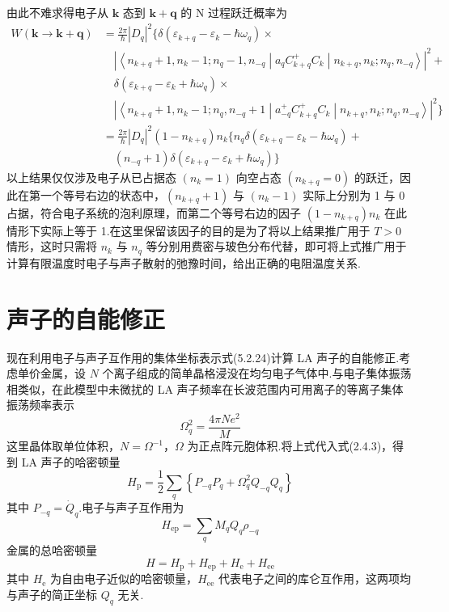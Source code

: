 由此不难求得电子从 $\boldsymbol{k}$ 态到 $\boldsymbol{k}+\boldsymbol{q}$ 的 N 过程跃迁概率为
\begin{equation}
\begin{aligned}
  W\left(\boldsymbol{k}\to\boldsymbol{k}+\boldsymbol{q}\right)&=\frac{2\pi}{\hbar}\left|D_q\right|^2
  \bigl\{\delta\left(\varepsilon_{k+q}-\varepsilon_k-\hbar\omega_q\right)\times\\
  &\quad\left|\left\langle n_{k+q}+1,n_k-1;n_q-1,n_{-q}\middle|a_qC_{k+q}^{+}C_k
  \middle|n_{k+q},n_k;n_q,n_{-q}\right\rangle\right|^2+\\
  &\quad\delta\left(\varepsilon_{k+q}-\varepsilon_k+\hbar\omega_q\right)\times\\
  &\quad\left|\left\langle n_{k+q}+1,n_k-1;n_q,n_{-q}+1\middle|a_{-q}^{+}C_{k+q}^{+}C_k
  \middle|n_{k+q},n_k;n_q,n_{-q}\right\rangle\right|^2\bigl\}\\
  &=\frac{2\pi}{\hbar}\left|D_q\right|^2\left(1-n_{k+q}\right)n_k
  \bigl\{n_q\delta\left(\varepsilon_{k+q}-\varepsilon_k-\hbar\omega_q\right)+\\
  &\quad\left(n_{-q}+1\right)\delta\left(\varepsilon_{k+q}-\varepsilon_k+\hbar\omega_q\right)\bigr\}
\end{aligned}
\end{equation}
以上结果仅仅涉及电子从已占据态 $\left(n_k=1\right)$ 向空占态 $\left(n_{k+q}=0\right)$ 的跃迁，因此在第一个等号右边的状态中，$\left(n_{k+q}+1\right)$ 与 $\left(n_k-1\right)$ 实际上分别为 1 与 0 占据，符合电子系统的泡利原理，而第二个等号右边的因子 $\left(1-n_{k+q}\right)n_k$ 在此情形下实际上等于 1.在这里保留该因子的目的是为了将以上结果推广用于 $T>0$ 情形，这时只需将 $n_k$ 与 $n_q$ 等分别用费密与玻色分布代替，即可将上式推广用于计算有限温度时电子与声子散射的弛豫时间，给出正确的电阻温度关系.

\section{声子的自能修正}

现在利用电子与声子互作用的集体坐标表示式(5.2.24)计算 LA 声子的自能修正.考虑单价金属，设 $N$ 个离子组成的简单晶格浸没在均匀电子气体中.与电子集体振荡相类似，在此模型中未微扰的 LA 声子频率在长波范围内可用离子的等离子集体振荡频率表示
\begin{equation}
  \Omega_q^2=\frac{4\pi Ne^2}{M}
\end{equation}
这里晶体取单位体积，$N=\Omega^{-1}$，$\Omega$ 为正点阵元胞体积.将上式代入式(2.4.3)，得到 LA 声子的哈密顿量
\begin{equation}
  H_{\mathrm{p}}=\frac{1}{2}\sum_{q}\left\{P_{-q}P_q+\Omega_q^2Q_{-q}Q_q\right\}
\end{equation}
其中 $P_{-q}=\dot{Q}_q$.电子与声子互作用为
\begin{equation*}
  H_{\mathrm{ep}}=\sum_{q}M_qQ_q\rho_{-q}
\end{equation*}
金属的总哈密顿量
\begin{equation}
  H=H_{\mathrm{p}}+H_{\mathrm{ep}}+H_{\mathrm{e}}+H_{\mathrm{ee}}
\end{equation}
其中 $H_{\mathrm{e}}$ 为自由电子近似的哈密顿量，$H_{\mathrm{ee}}$ 代表电子之间的库仑互作用，这两项均与声子的简正坐标 $Q_q$ 无关.

